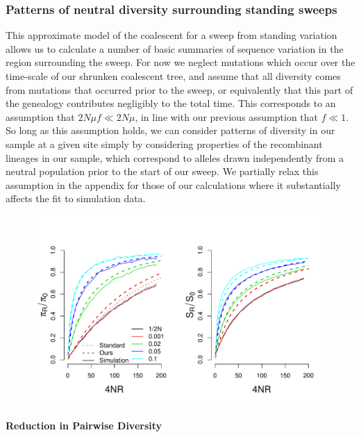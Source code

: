 \documentclass[a4paper,10pt]{article}
\begin{document}
\subsubsection*{Patterns of neutral diversity surrounding standing sweeps}
This approximate model of the coalescent for a sweep from standing variation allows us to calculate a number of basic summaries of sequence variation in the region surrounding the sweep. For now we neglect mutations which occur over the time-scale of our shrunken coalescent tree, and assume that all diversity comes from mutations that occurred prior to the sweep, or equivalently that this part of the genealogy contributes negligibly to the total time. This corresponds to an assumption that $2N \mu f \ll 2N\mu$, in line with our previous assumption that $f \ll 1$. So long as this assumption holds, we can consider patterns of diversity in our sample at a given site simply by considering properties of the recombinant lineages in our sample, which correspond to alleles drawn independently from a neutral population prior to the start of our sweep. We partially relax this assumption in the appendix for those of our calculations where it substantially affects the fit to simulation data.

\begin{figure}
	\includegraphics[width = \textwidth]{../Paper_Figures/pi_and_S_density.pdf} \label{pi_plot}
\end{figure}


\paragraph{Reduction in Pairwise Diversity}
\end{document}
